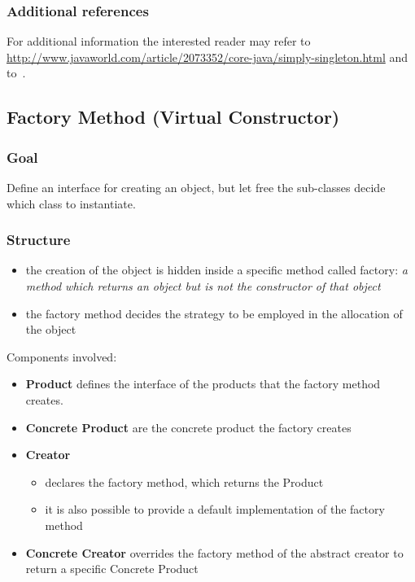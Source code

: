 \documentclass{article}
\begin{document}
\subsubsection{Additional references}
For additional information the interested reader may refer to \url{http://www.javaworld.com/article/2073352/core-java/simply-singleton.html} and to~\cite{gamma1994design}.


\subsection{Factory Method (Virtual Constructor)}
\subsubsection{Goal}
Define an interface for creating an object, but let free the sub-classes decide which class to instantiate.

\subsubsection{Structure}


\begin{itemize}
\item the creation of the object is hidden inside a specific method called factory: \emph{a method which returns an object but is not the constructor of that object}
\item the factory method decides the strategy to be employed in the allocation of the object
\end{itemize}


Components involved:

\begin{itemize}
\item  \textbf{Product} defines the interface of the products that the factory method creates.
\item \textbf{Concrete Product} are the concrete product the factory creates
\item  \textbf{Creator} 
\begin{itemize}
\item declares the factory method, which returns the Product
\item it is also possible to provide a default implementation of the factory method 
\end{itemize}
\item \textbf{Concrete Creator} overrides the factory method of the abstract creator to return a specific Concrete Product
\end{itemize}
\end{document}
